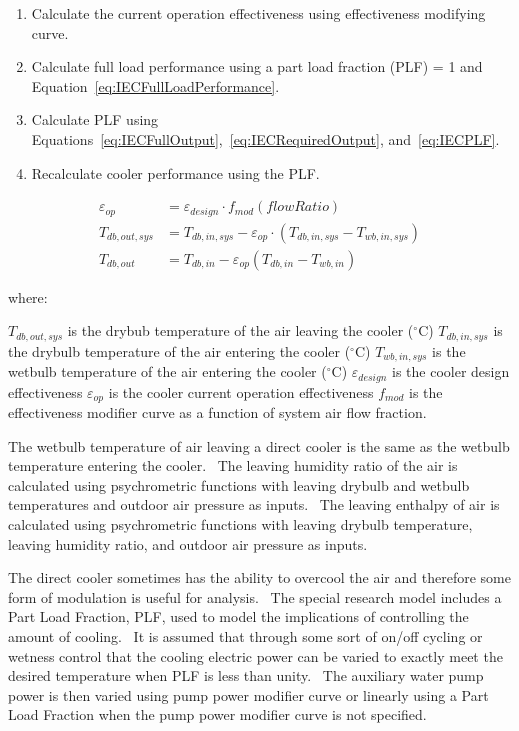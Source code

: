\begin{enumerate}
\item Calculate the current operation effectiveness using effectiveness modifying curve.
\item Calculate full load performance using a part load fraction (PLF) = 1 and Equation~\ref{eq:IECFullLoadPerformance}.
\item Calculate PLF using Equations~\ref{eq:IECFullOutput},~\ref{eq:IECRequiredOutput}, and~\ref{eq:IECPLF}.
\item Recalculate cooler performance using the PLF.
\end{enumerate}


\begin{equation}
 \begin{array}{rl}
  \varepsilon_{op} & = \varepsilon_{design}\cdot f_{mod}\left(flowRatio\right) \\
  T_{db,out,sys} & = T_{db,in,sys} - \varepsilon_{op}\cdot\left(T_{db,in,sys}-T_{wb,in,sys}\right) \\
  T_{db,out} & = T_{db,in}-\varepsilon_{op}\left(T_{db,in}-T_{wb,in}\right)
 \end{array}
\label{eq:IECFullLoadPerformance}
\end{equation}

where:

\({T_{db,out,sys}}\) is the drybub temperature of the air leaving the cooler (\(^{\circ}\)C)
\({T_{db,in,sys}}\) is the drybulb temperature of the air entering the cooler (\(^{\circ}\)C)
\({T_{wb,in,sys}}\) is the wetbulb temperature of the air entering the cooler (\(^{\circ}\)C)
\(\varepsilon_{design}\) is the cooler design effectiveness
\(\varepsilon_{op}\) is the cooler current operation effectiveness
\(f_{mod}\) is the effectiveness modifier curve as a function of system air flow fraction.

The wetbulb temperature of air leaving a direct cooler is the same as the wetbulb temperature entering the cooler.~ The leaving humidity ratio of the air is calculated using psychrometric functions with leaving drybulb and wetbulb temperatures and outdoor air pressure as inputs.~ The leaving enthalpy of air is calculated using psychrometric functions with leaving drybulb temperature, leaving humidity ratio, and outdoor air pressure as inputs.

The direct cooler sometimes has the ability to overcool the air and therefore some form of modulation is useful for analysis.~ The special research model includes a Part Load Fraction, PLF, used to model the implications of controlling the amount of cooling.~ It is assumed that through some sort of on/off cycling or wetness control that the cooling electric power can be varied to exactly meet the desired temperature when PLF is less than unity.~ The auxiliary water pump power is then varied using pump power modifier curve or linearly using a Part Load Fraction when the pump power modifier curve is not specified.


